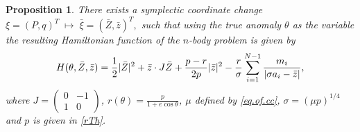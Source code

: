 \documentclass[11pt]{article}
\newtheorem{proposition}[lemma]{Proposition}
\def\lb{\label}
\def\th{{\theta}}
\def\sg{{\sigma}}
\begin{document}
\begin{proposition}\label{P2.1}
There exists a symplectic coordinate change
$
  \xi = (P,q)^T
    \;\mapsto\; \bar{\xi}
    = ( \bar{Z}, \bar{z})^T,$
such that using the true anomaly $\th$ as the variable the resulting Hamiltonian function of the
$n$-body problem is given by
\begin{align}\lb{eqn:red.Ham}
  H(\theta,\bar{Z},\bar{z})=\frac{1}{2}|\bar{Z}|^2 + \bar{z}\cdot J\bar{Z}
+ \frac{p-r}{2p}|\bar{z}|^2
- \frac{r}{\sg}\sum_{i=1}^{N-1}{m_i\over|\sg a_i-\bar{z}|},
\end{align}
where $J =( 
\begin{smallmatrix}
       0 &-1 \\ 1 & 0
\end{smallmatrix})$, $r(\th)=\frac{p}{1+e\cos\th}$,
$\mu$ defined by \eqref{eq.of.cc}, $\sg=(\mu p)^{1/4}$ and $p$ is given in \eqref{rTh}.
\end{proposition}
\end{document}
